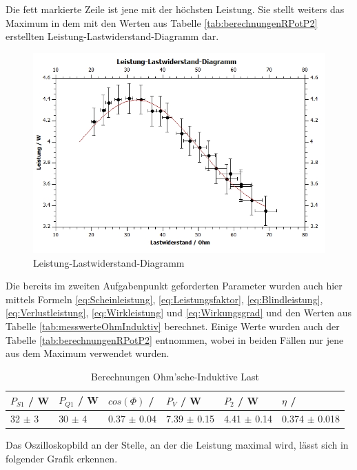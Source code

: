 \documentclass[12pt,a4paper,twoside]{article}
\begin{document}
\noindent
Die fett markierte Zeile ist jene mit der höchsten Leistung. Sie stellt weiters das Maximum in dem mit den Werten aus Tabelle \ref{tab:berechnungenRPotP2} erstellten Leistung-Lastwiderstand-Diagramm dar.

\begin{figure}[H]
    \centering
    \includegraphics[width=0.6\linewidth, angle=0]{nudes/Leistung-Lastwiderstand-Diagramm.jpg}
    \caption{Leistung-Lastwiderstand-Diagramm}
    \label{fig:LeistungLastwiderstandDiagramm}
\end{figure}

\noindent
Die bereits im zweiten Aufgabenpunkt geforderten Parameter wurden auch hier mittels Formeln \ref{eq:Scheinleistung}, \ref{eq:Leistungsfaktor}, \ref{eq:Blindleistung}, \ref{eq:Verlustleistung}, \ref{eq:Wirkleistung} und \ref{eq:Wirkungsgrad} und den Werten aus Tabelle \ref{tab:messwerteOhmInduktiv} berechnet. Einige Werte wurden auch der Tabelle \ref{tab:berechnungenRPotP2} entnommen, wobei in beiden Fällen nur jene aus dem Maximum verwendet wurden.

\begin{table}[H]
    \centering
    \caption{Berechnungen Ohm'sche-Induktive Last}
    \label{tab:BerechnungenOhmInd}
    \begin{tabular}{| l | l | l | l | l | l |}
        \hline
        $P_{S1}$ / W & $P_{Q1}$ / W & $cos(\Phi)$ / & $P_{V}$ / W & $P_{2}$ / W & $\eta$ / \\
        \hline
        32 $\pm$ 3 & 30 $\pm$ 4 & 0.37 $\pm$ 0.04 & 7.39 $\pm$ 0.15 & 4.41 $\pm$ 0.14 & 0.374 $\pm$ 0.018 \\
        \hline
    \end{tabular}
\end{table}

\noindent
Das Oszilloskopbild an der Stelle, an der die Leistung maximal wird, lässt sich in folgender Grafik erkennen.
\end{document}
